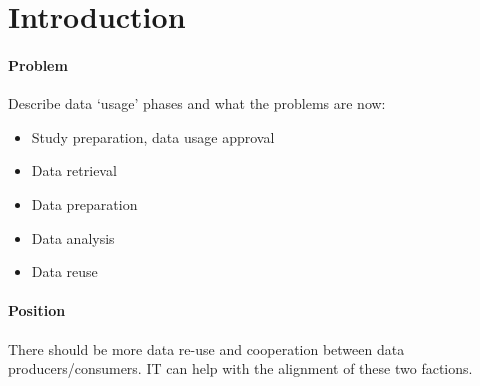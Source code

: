 
\section{Introduction}
\paragraph{Problem}
Describe data `usage' phases and what the problems are now:
\begin{itemize}
	\item Study preparation, data usage approval
	\item Data retrieval
	\item Data preparation
	\item Data analysis
	\item Data reuse
\end{itemize}


\paragraph{Position}
There should be more data re-use and cooperation between data producers/consumers.
IT can help with the alignment of these two factions.



